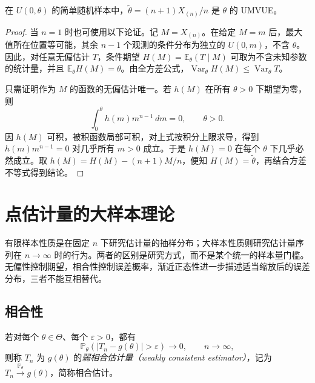 \begin{proposition}[均匀总体中修正最大值的最优性]
\label{prop:study-uniform-maximum-umvue}
在 $U(0,\theta)$ 的简单随机样本中，$\widetilde\theta=(n+1)X_{(n)}/n$ 是 $\theta$ 的 UMVUE。
\end{proposition}

\begin{proof}
当 $n=1$ 时也可使用以下论证。记 $M=X_{(n)}$。在给定 $M=m$ 后，最大值所在位置等可能，其余 $n-1$ 个观测的条件分布为独立的 $U(0,m)$，不含 $\theta$。因此，对任意无偏估计 $T$，条件期望 $H(M)=\mathbb E_\theta(T\mid M)$ 可取为不含未知参数的统计量，并且 $\mathbb E_\theta H(M)=\theta$。由全方差公式，$\operatorname{Var}_\theta H(M)\le\operatorname{Var}_\theta T$。

只需证明作为 $M$ 的函数的无偏估计唯一。若 $h(M)$ 在所有 $\theta>0$ 下期望为零，则
\[
  \int_0^\theta h(m)m^{n-1}\,dm=0,\qquad\theta>0.
\]
因 $h(M)$ 可积，被积函数局部可积，对上式按积分上限求导，得到 $h(m)m^{n-1}=0$ 对几乎所有 $m>0$ 成立。于是 $h(M)=0$ 在每个 $\theta$ 下几乎必然成立。取 $h(M)=H(M)-(n+1)M/n$，便知 $H(M)=\widetilde\theta$，再结合方差不等式得到结论。
\end{proof}

\section{点估计量的大样本理论}
\label{sec:study-estimator-asymptotics}

有限样本性质是在固定 $n$ 下研究估计量的抽样分布；大样本性质则研究估计量序列在 $n\to\infty$ 时的行为。两者的区别是研究方式，而不是某个统一的样本量门槛。无偏性控制期望，相合性控制误差概率，渐近正态性进一步描述适当缩放后的误差分布，三者不能互相替代。

\subsection{相合性}

\begin{definition}[相合估计]
\label{def:study-consistent-estimator}
若对每个 $\theta\in\Theta$、每个 $\varepsilon>0$，都有
\begin{equation}
  \mathbb P_\theta(|T_n-g(\theta)|>\varepsilon)\longrightarrow0,
  \qquad n\to\infty,
  \label{eq:study-estimator-consistency}
\end{equation}
则称 $T_n$ 为 $g(\theta)$ 的\emph{弱相合估计量（weakly consistent estimator）}，记为 $T_n\xrightarrow{\mathbb P_\theta}g(\theta)$，简称相合估计。
\end{definition}

